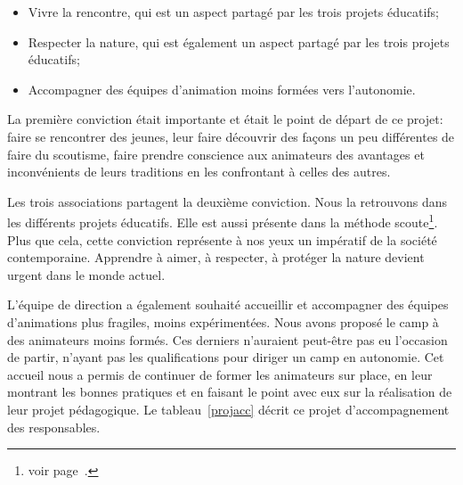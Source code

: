 \documentclass[titlepage,11pt,a4paper]{article}
\begin{document}
\begin{itemize}
   \item Vivre la rencontre, qui est un aspect partagé par les trois projets éducatifs;
   \item Respecter la nature, qui est également un aspect partagé par les trois projets
      éducatifs;
   \item Accompagner des équipes d'animation moins formées vers l'autonomie.
\end{itemize}

La première conviction était importante et était le point de départ de ce projet: faire se
rencontrer des jeunes, leur faire découvrir des façons un peu différentes de faire du
scoutisme, faire prendre conscience aux animateurs des avantages et inconvénients de leurs
traditions en les confrontant à celles des autres.

Les trois associations partagent la deuxième conviction. Nous la retrouvons dans les
différents projets éducatifs. Elle est aussi présente dans la méthode scoute\footnote{voir
page~\pageref{methsc}.}. Plus que cela, cette conviction représente à nos yeux un impératif de la société
contemporaine. Apprendre à aimer, à respecter, à protéger la nature devient urgent dans le
monde actuel.

L'équipe de direction a également souhaité accueillir et accompagner des équipes
d'animations plus fragiles, moins expérimentées. Nous avons proposé le camp à des animateurs moins formés. Ces
derniers n'auraient peut-être pas eu l'occasion de partir, n'ayant pas les qualifications
pour diriger un camp en autonomie. Cet accueil nous a permis de continuer de former les
animateurs sur place, en leur montrant les bonnes pratiques et en faisant le point avec
eux sur la réalisation de leur projet pédagogique.
Le tableau~\ref{projacc} décrit ce projet d'accompagnement des responsables.
\end{document}
